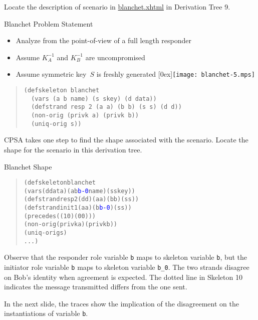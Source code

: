 \documentclass[landscape]{slides}
\newcommand{\cpsa}{CPSA}
\newcommand{\privk}[1]{K^{-1}_{#1}}
\begin{document}
\begin{note}
  Locate the description of scenario in \url{blanchet.xhtml} in
  Derivation Tree 9.
\end{note}

\begin{mitreslide}{Blanchet Problem Statement}
\begin{itemize}
\item Analyze from the point-of-view of a full length responder
\item Assume $\privk{A}$ and $\privk{B}$ are uncompromised
\item Assume symmetric key~$S$ is freshly generated
\hfill\raisebox{0ex}[0ex]{\texttt{[image: blanchet-5.mps]}}
\end{itemize}
\begin{quote}
\begin{verbatim}
(defskeleton blanchet
  (vars (a b name) (s skey) (d data))
  (defstrand resp 2 (a a) (b b) (s s) (d d))
  (non-orig (privk a) (privk b))
  (uniq-orig s))
\end{verbatim}
\end{quote}
\end{mitreslide}

\begin{note}
  {\cpsa} takes one step to find the shape associated with the scenario.
  Locate the shape for the scenario in this derivation tree.
\end{note}

\begin{mitreslide}{Blanchet Shape}
\begin{quote}
\begin{alltt}
(defskeleton blanchet
  (vars (d data) (a b \textcolor{blue}{b-0} name) (s skey))
  (defstrand resp 2 (d d) (a a) (b b) (s s))
  (defstrand init 1 (a a) (b \textcolor{blue}{b-0}) (s s))
  (precedes ((1 0) (0 0)))
  (non-orig (privk a) (privk b))
  (uniq-orig s)
  ...)
\end{alltt}
\end{quote}
\end{mitreslide}

\begin{note}
  Observe that the responder role variable \texttt{b} maps to skeleton
  variable \texttt{b}, but the initiator role variable \texttt{b} maps
  to skeleton variable \texttt{b\_0}.  The two strands disagree on
  Bob's identity when agreement is expected.  The dotted line in
  Skeleton 10 indicates the message transmitted differs from the one sent.

  In the next slide, the traces show the implication of the
  disagreement on the instantiations of variable \texttt{b}.
\end{note}
\end{document}
